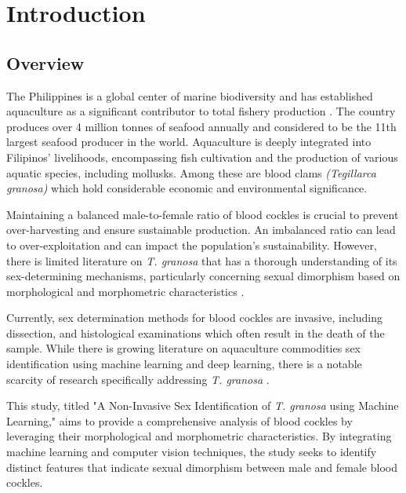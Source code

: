 \chapter{Introduction}
\label{sec:researchdesc}    %

\section{Overview}
\label{sec:overview}

The Philippines is a global center of marine biodiversity and has established aquaculture as a significant contributor to total fishery production \cite{aypa2000, bfar2019}. The country produces over 4 million tonnes of seafood annually and considered to be the 11th largest seafood producer in the world. Aquaculture is deeply integrated into Filipinos' livelihoods, encompassing fish cultivation and the production of various aquatic species, including mollusks. Among these are blood clams \textit{(Tegillarca granosa)} which hold considerable economic and environmental significance.

Maintaining a balanced male-to-female ratio of blood cockles is crucial to prevent over-harvesting and ensure sustainable production. An imbalanced ratio can lead to over-exploitation and can impact the population's sustainability. However, there is limited literature on \textit{T. granosa} that has a thorough understanding of its sex-determining mechanisms, particularly concerning sexual dimorphism based on morphological and morphometric characteristics \cite{breton2017sex}.

Currently, sex determination methods for blood cockles are invasive, including dissection, and histological examinations which often result in the death of the sample. While there is growing literature on aquaculture commodities sex identification using machine learning and deep learning, there is a notable scarcity of research specifically addressing \textit{T. granosa} \cite{miranda2023}.

This study, titled "A Non-Invasive Sex Identification of \textit{T. granosa} using Machine Learning," aims to provide a comprehensive analysis of blood cockles by leveraging their morphological and morphometric characteristics. By integrating machine learning and computer vision techniques, the study seeks to identify distinct features that indicate sexual dimorphism between male and female blood cockles.

